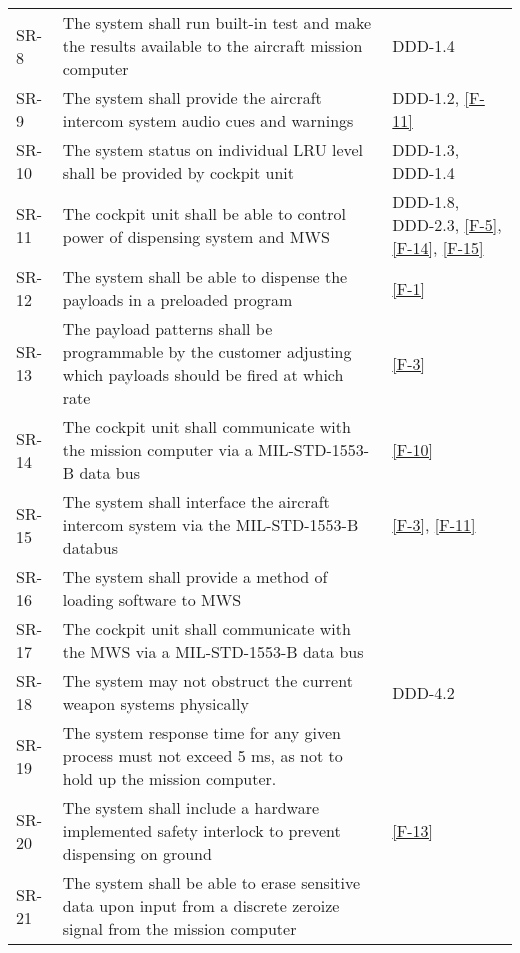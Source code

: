 \documentclass[Main]{subfiles}
\begin{document}
\begin{longtable}{p{} p{} p{}}
SR-8 &  The system shall run built-in test and make the results available to the aircraft mission computer & DDD-1.4 \\

SR-9 & The system shall provide the aircraft intercom system audio cues and warnings & DDD-1.2, \ref{F-11} \\

SR-10 &  The system status on individual LRU level shall be provided by cockpit unit & DDD-1.3, DDD-1.4 \\

SR-11 & The cockpit unit shall be able to control power of dispensing system and MWS & DDD-1.8, DDD-2.3, \ref{F-5}, \ref{F-14}, \ref{F-15} \\

SR-12 & The system shall be able to dispense the payloads in a preloaded program &  \ref{F-1}\\

SR-13 & The payload patterns shall be programmable by the customer adjusting which payloads should be fired at which rate & \ref{F-3} \\

SR-14 & The cockpit unit shall communicate with the mission computer via a MIL-STD-1553-B data bus &  \ref{F-10}\\

SR-15 & The system shall interface the aircraft intercom system via the MIL-STD-1553-B databus & \ref{F-3}, \ref{F-11} \\

SR-16 & The system shall provide a method of loading software to MWS &  \\

SR-17 & The cockpit unit shall communicate with the MWS via a MIL-STD-1553-B data bus &  \\

SR-18 & The system may not obstruct the current weapon systems physically & DDD-4.2 \\

SR-19 & The system response time for any given process must not exceed 5 ms, as not to hold up the mission computer. &  \\

SR-20 & The system shall include a hardware implemented safety interlock to prevent dispensing on ground & \ref{F-13} \\

SR-21 & The system shall be able to erase sensitive data upon input from a discrete zeroize signal from the mission computer &  \\


\end{longtable}
\end{document}
